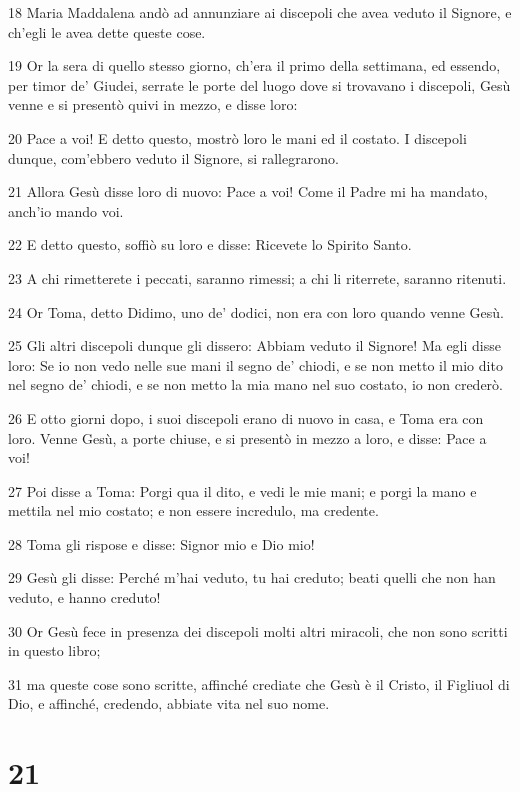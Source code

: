 \par 18 Maria Maddalena andò ad annunziare ai discepoli che avea veduto il Signore, e ch'egli le avea dette queste cose.
\par 19 Or la sera di quello stesso giorno, ch'era il primo della settimana, ed essendo, per timor de' Giudei, serrate le porte del luogo dove si trovavano i discepoli, Gesù venne e si presentò quivi in mezzo, e disse loro:
\par 20 Pace a voi! E detto questo, mostrò loro le mani ed il costato. I discepoli dunque, com'ebbero veduto il Signore, si rallegrarono.
\par 21 Allora Gesù disse loro di nuovo: Pace a voi! Come il Padre mi ha mandato, anch'io mando voi.
\par 22 E detto questo, soffiò su loro e disse: Ricevete lo Spirito Santo.
\par 23 A chi rimetterete i peccati, saranno rimessi; a chi li riterrete, saranno ritenuti.
\par 24 Or Toma, detto Didimo, uno de' dodici, non era con loro quando venne Gesù.
\par 25 Gli altri discepoli dunque gli dissero: Abbiam veduto il Signore! Ma egli disse loro: Se io non vedo nelle sue mani il segno de' chiodi, e se non metto il mio dito nel segno de' chiodi, e se non metto la mia mano nel suo costato, io non crederò.
\par 26 E otto giorni dopo, i suoi discepoli erano di nuovo in casa, e Toma era con loro. Venne Gesù, a porte chiuse, e si presentò in mezzo a loro, e disse: Pace a voi!
\par 27 Poi disse a Toma: Porgi qua il dito, e vedi le mie mani; e porgi la mano e mettila nel mio costato; e non essere incredulo, ma credente.
\par 28 Toma gli rispose e disse: Signor mio e Dio mio!
\par 29 Gesù gli disse: Perché m'hai veduto, tu hai creduto; beati quelli che non han veduto, e hanno creduto!
\par 30 Or Gesù fece in presenza dei discepoli molti altri miracoli, che non sono scritti in questo libro;
\par 31 ma queste cose sono scritte, affinché crediate che Gesù è il Cristo, il Figliuol di Dio, e affinché, credendo, abbiate vita nel suo nome.

\chapter{21}


